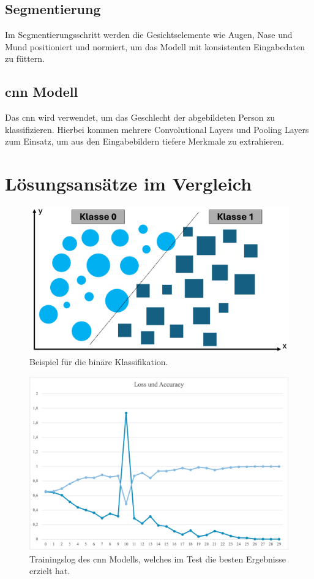 \documentclass[journal,twoside,web]{ieeecolor}
\begin{document}
\subsection{Segmentierung}
Im Segmentierungsschritt werden die Gesichtselemente wie Augen, Nase und Mund positioniert und normiert, um das Modell mit konsistenten Eingabedaten zu füttern.

\subsection{\ac{cnn} Modell}
Das \ac{cnn} wird verwendet, um das Geschlecht der abgebildeten Person zu klassifizieren. Hierbei kommen mehrere Convolutional Layers und Pooling Layers zum Einsatz, um aus den Eingabebildern tiefere Merkmale zu extrahieren.

\section{Lösungsansätze im Vergleich}

\begin{figure}[!t]
    \centerline{\includegraphics[width=\columnwidth]{Andi/binaere_klassifikation.png}}
    \caption{Beispiel für die binäre Klassifikation.}
    \label{fig:binaere_klassifikation}
\end{figure}

\begin{figure}[!t]
    \centerline{\includegraphics[width=\columnwidth]{Andi/Loss_Acc_Gewinner.png}}
    \caption{Trainingslog des \ac{cnn} Modells, welches im Test die besten Ergebnisse erzielt hat.}
    \label{fig:winner}
\end{figure}
\end{document}
